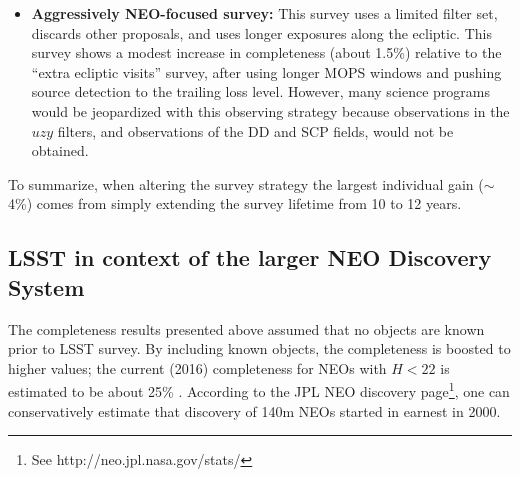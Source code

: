 \begin{itemize}
\item \textbf{Aggressively NEO-focused survey:} This survey uses a limited filter set, discards other proposals, and uses longer exposures along the ecliptic. This survey shows a modest increase in completeness (about 1.5\%) relative to the ``extra ecliptic visits'' survey, after using longer MOPS windows and pushing source detection to the trailing loss level.
However, many science programs would be jeopardized with this observing strategy because observations in the $uzy$ filters,
and observations of the DD and SCP fields, would not be obtained.
\end{itemize}

To summarize, when altering the survey strategy the largest individual gain ($\sim$4\%)
comes from simply extending the survey lifetime from 10 to 12 years. 

\subsection{LSST in context of the larger NEO Discovery System\label{sec:known}}

The completeness results presented above assumed that no objects are known prior to LSST survey.
By including known objects, the completeness is boosted to higher values; the current (2016)
completeness for NEOs with $H<22$ is estimated to be about 25\% \citep{GMS2016}. According to the JPL NEO discovery page\footnote{See http://neo.jpl.nasa.gov/stats/}, one can conservatively estimate that
discovery of 140m NEOs started in earnest in 2000.

